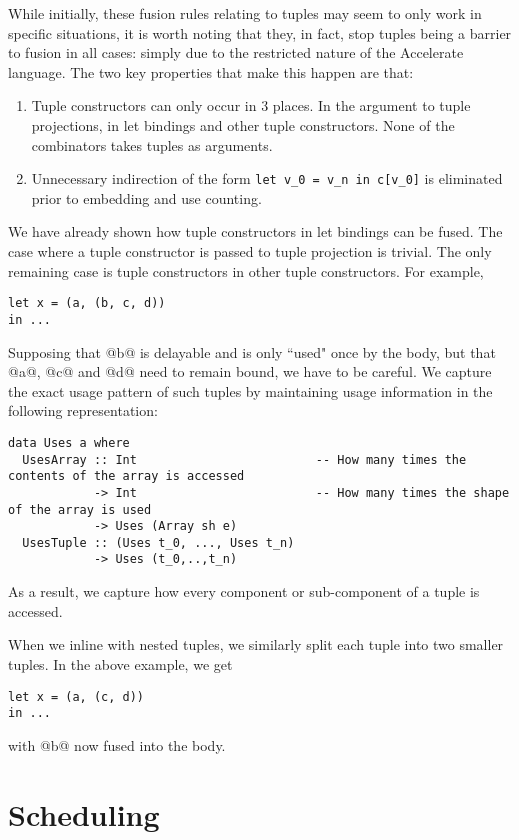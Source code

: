 While initially, these fusion rules relating to tuples may seem to only work in specific situations, it is worth noting that they, in fact, stop tuples being a barrier to fusion in all cases: simply due to the restricted nature of the Accelerate language. The two key properties that make this happen are that:
\begin{enumerate}
\item Tuple constructors can only occur in 3 places. In the argument to tuple projections, in let bindings and other tuple constructors. None of the combinators takes tuples as arguments.
\item Unnecessary indirection of the form \lstinline[style=ndp]{let v_0 = v_n in c[v_0]} is eliminated prior to embedding and use counting.
\end{enumerate}
%
We have already shown how tuple constructors in let bindings can be fused. The case where a tuple constructor is passed to tuple projection is trivial. The only remaining case is tuple constructors in other tuple constructors. For example,
%
\begin{lstlisting}
let x = (a, (b, c, d))
in ...
\end{lstlisting}
%
Supposing that @b@ is delayable and is only ``used" once by the body, but that @a@, @c@ and @d@ need to remain bound, we have to be careful. We capture the exact usage pattern of such tuples by maintaining usage information in the following representation:
%
\begin{lstlisting}
data Uses a where
  UsesArray :: Int                         -- How many times the contents of the array is accessed
            -> Int                         -- How many times the shape of the array is used
            -> Uses (Array sh e)
  UsesTuple :: (Uses t_0, ..., Uses t_n)
            -> Uses (t_0,..,t_n)
\end{lstlisting}
%
As a result, we capture how every component or sub-component of a tuple is accessed.

When we inline with nested tuples, we similarly split each tuple into two smaller tuples. In the above example, we get
%
\begin{lstlisting}
let x = (a, (c, d))
in ...
\end{lstlisting}
%
with @b@ now fused into the body.


\section{Scheduling}
\label{sec:scheduling}

